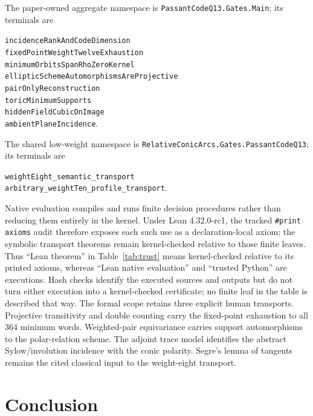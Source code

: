 \documentclass[11pt]{article}
\theoremstyle{definition}
\theoremstyle{remark}
\begin{document}
The paper-owned aggregate namespace is
\nolinkurl{PassantCodeQ13.Gates.Main}; its terminals are
\begin{flushleft}
\small
\nolinkurl{incidenceRankAndCodeDimension}\\
\nolinkurl{fixedPointWeightTwelveExhaustion}\\
\nolinkurl{minimumOrbitsSpanRhoZeroKernel}\\
\nolinkurl{ellipticSchemeAutomorphismsAreProjective}\\
\nolinkurl{pairOnlyReconstruction}\\
\nolinkurl{toricMinimumSupports}\\
\nolinkurl{hiddenFieldCubicOnImage}\\
\nolinkurl{ambientPlaneIncidence}.
\end{flushleft}
The shared low-weight namespace is
\nolinkurl{RelativeConicArcs.Gates.PassantCodeQ13}; its terminals are
\begin{flushleft}
\small
\nolinkurl{weightEight_semantic_transport}\\
\nolinkurl{arbitrary_weightTen_profile_transport}.
\end{flushleft}

Native evaluation compiles and runs finite decision procedures rather than
reducing them entirely in the kernel.  Under Lean \(4.32.0\)-rc1, the
tracked \texttt{\#print axioms} audit therefore exposes each such use as a
declaration-local axiom; the symbolic transport theorems remain
kernel-checked relative to those finite leaves.
Thus ``Lean theorem'' in Table~\ref{tab:trust} means kernel-checked relative
to its printed axioms, whereas ``Lean native evaluation'' and ``trusted
Python'' are executions.  Hash checks identify the executed sources and
outputs but do not turn either execution into a kernel-checked certificate;
no finite leaf in the table is described that way.
The formal scope retains three explicit human transports.  Projective
transitivity and double counting carry the fixed-point exhaustion to all
\(364\) minimum words.  Weighted-pair equivariance carries support
automorphisms to the polar-relation scheme.  The adjoint trace model
identifies the abstract Sylow/involution incidence with the conic polarity.
Segre's lemma of tangents remains the cited classical input to the
weight-eight transport.

\section{Conclusion}
\end{document}
